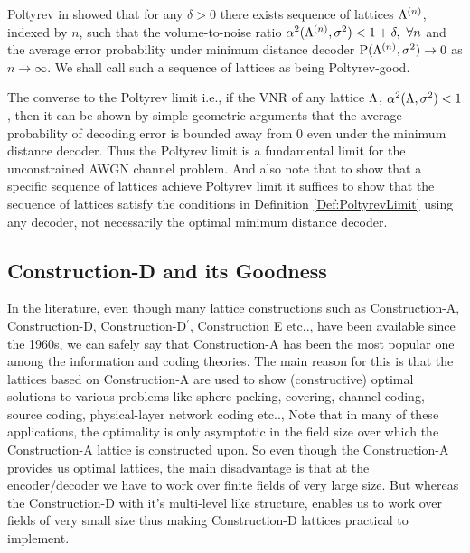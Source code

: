 \begin{definition}\label{Def:PoltyrevLimit}
Poltyrev in \cite{poltyrev94} showed that for any $\delta>0$ there exists sequence of lattices $\Lambda^{(n)}$, indexed by $n$, such that the volume-to-noise ratio $\alpha^{2}(\Lambda^{(n)},\sigma^{2})<1+\delta,~ \forall n$ and the average error probability under minimum distance decoder $\text{P}(\Lambda^{(n)},\sigma^{2}) \rightarrow 0$ as $n \rightarrow \infty$. We shall call such a sequence of lattices as being Poltyrev-good.
\end{definition}
\begin{remark}
The converse to the Poltyrev limit i.e., if the VNR of any lattice $\Lambda$, $\alpha^{2}(\Lambda,\sigma^{2})<1$, then it can be shown by simple geometric arguments that the average probability of decoding error is bounded away from $0$ even under the minimum distance decoder. Thus the Poltyrev limit is a fundamental limit for the unconstrained AWGN channel problem. And also note that to show that a specific sequence of lattices achieve Poltyrev limit it suffices to show that the sequence of lattices satisfy the conditions in Definition \ref{Def:PoltyrevLimit} using any decoder, not necessarily the optimal minimum distance decoder.
\end{remark}
\subsection{Construction-D and its Goodness}
In the literature, even though many lattice constructions such as Construction-A, Construction-D, Construction-D$^\prime$, Construction E etc.., have been available  since the 1960s, we can safely say that Construction-A has been the most popular one among the information and coding theories. The main reason for this is that the lattices based on Construction-A are used to show (constructive) optimal solutions to various problems like sphere packing, covering, channel coding, source coding, physical-layer network coding etc.., Note that in many of these applications, the optimality is only asymptotic in the field size over which the Construction-A lattice is constructed upon. So even though the Construction-A provides us optimal lattices, the main disadvantage is that at the encoder/decoder we have to work over finite fields of very large size. But whereas the Construction-D with it's multi-level like structure, enables us to work over fields of very small size thus making Construction-D lattices practical to implement.

